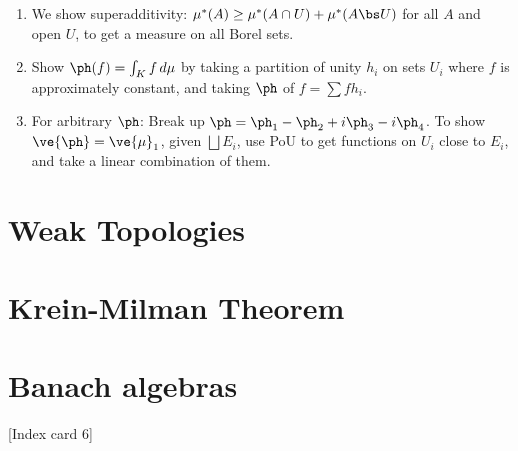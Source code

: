 \begin{enumerate}
\begin{enumerate}
\item 
We show superadditivity: $\mu^*(A)\ge \mu^*(A\cap U)+\mu^*(A\bs U)$ for all $A$ and open $U$, to get a measure on all Borel sets.
\item Show $\ph(f)=\int_K f\,d\mu$ by taking a partition of unity $h_i$ on sets $U_i$ where $f$ is approximately constant, and taking $\ph$ of $f=\sum fh_i$.
\item For arbitrary $\ph$: Break up $\ph=\ph_1-\ph_2+i\ph_3-i\ph_4$. To show $\ve{\ph}=\ve{\mu}_1$, given $\bigsqcup E_i$, use PoU to get functions on $U_i$ close to $E_i$, and take a linear combination of them.
\end{enumerate}
\end{enumerate}

\section{Weak Topologies}

\section{Krein-Milman Theorem}

\section{Banach algebras}

[Index card 6]

